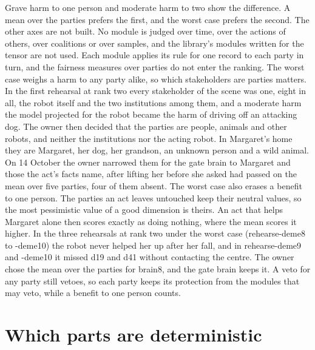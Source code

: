 Grave harm to one person and moderate harm to two show the difference. A mean over the parties
prefers the first, and the worst case prefers the second.
The other axes are not built. No module is judged over time, over the actions of others, over
coalitions or over samples, and the library's modules written for the tensor are not used. Each
module applies its rule for one record to each party in turn, and the fairness measures over
parties do not enter the ranking.
The worst case weighs a harm to any party alike, so which stakeholders are parties matters. In the
first rehearsal at rank two every stakeholder of the scene was one, eight in all, the robot itself
and the two institutions among them, and a moderate harm the model projected for the robot became
the harm of driving off an attacking dog.
The owner then decided that the parties are people, animals and other robots, and neither the
institutions nor the acting robot. In Margaret's home they are Margaret, her dog, her grandson, an
unknown person and a wild animal.
On 14 October the owner narrowed them for the gate brain to Margaret and those the act's facts
name, after lifting her before she asked had passed on the mean over five parties, four of them
absent.
The worst case also erases a benefit to one person. The parties an act leaves untouched keep their
neutral values, so the most pessimistic value of a good dimension is theirs. An act that helps
Margaret alone then scores exactly as doing nothing, where the mean scores it higher.
In the three rehearsals at rank two under the worst case (rehearse-deme8 to -deme10) the robot
never helped her up after her fall, and in rehearse-deme9 and -deme10 it missed d19 and d41
without contacting the centre.
The owner chose the mean over the parties for brain8, and the gate brain keeps it. A veto for any party still
vetoes, so each party keeps its protection from the modules that may veto, while a benefit to one
person counts.

\section{Which parts are deterministic}\label{sec:deme-deterministic}

